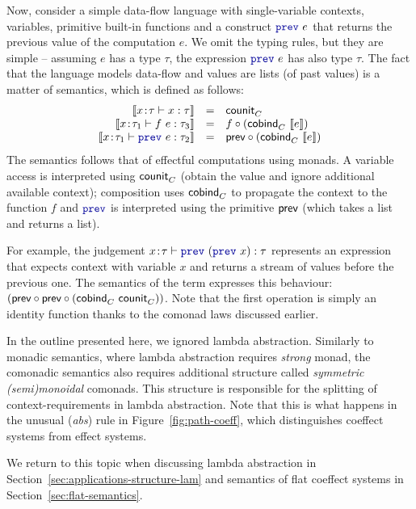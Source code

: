 Now, consider a simple data-flow language with single-variable contexts, variables, 
primitive built-in functions and a construct $\kvd{prev}~e$ that returns the previous
value of the computation $e$. We omit the typing rules, but they are simple -- assuming $e$ 
has a type $\tau$, the expression $\kvd{prev}~e$ has also type $\tau$. The fact that
the language models data-flow and values are lists (of past values) is a matter of semantics,
which is defined as follows:
%
\begin{equation*}
\begin{array}{rcl}
\sem{x\!:\!\tau \vdash x : \tau} &=& \ident{counit}_\ctyp{}{}\\
\sem{x\!:\!\tau_1 \vdash f~e : \tau_3} &=& f \circ (\ident{cobind}_\ctyp{}{} ~\sem{e})\\
\sem{x\!:\!\tau_1 \vdash \kvd{prev}~e : \tau_2} &=& \ident{prev} \circ (\ident{cobind}_\ctyp{}{} ~\sem{e})\\
\end{array}
\end{equation*}
%
The semantics follows that of effectful computations using monads. A variable access is interpreted
using $\textnormal{\sffamily counit}_C^{}$ (obtain the value and ignore additional available context); composition
uses $\textnormal{\sffamily cobind}_C^{}$ to propagate the context to the function $f$ and $\kvd{prev}$
is interpreted using the primitive $\textnormal{\sffamily prev}$ (which takes a list and returns a list).

For example, the judgement $x\!:\!\tau \vdash \kvd{prev}~(\kvd{prev}~x) : \tau$ represents an 
expression that expects context with variable $x$ and returns a stream of values before the 
previous one. The semantics of the term expresses this behaviour: 
$(\textnormal{\sffamily prev} \circ \textnormal{\sffamily prev} \circ (\textnormal{\sffamily cobind}_C^{}~\textnormal{\sffamily counit}_C^{}))$.
Note that the first operation is simply an identity function thanks to the comonad laws discussed 
earlier.

In the outline presented here, we ignored lambda abstraction. Similarly to monadic semantics,
where lambda abstraction requires \emph{strong} monad, the comonadic semantics also requires
additional structure called \emph{symmetric (semi)monoidal} comonads. This structure is 
responsible for the splitting of context-requirements in lambda abstraction. Note that this is 
what happens in the unusual (\emph{abs}) rule in Figure~\ref{fig:path-coeff}, which distinguishes
coeffect systems from effect systems. 

We return to this topic when discussing lambda abstraction in Section~\ref{sec:applications-structure-lam} 
and semantics of flat coeffect systems in Section~\ref{sec:flat-semantics}.

